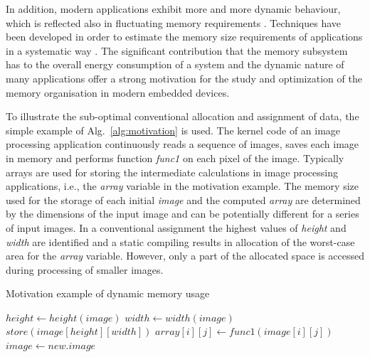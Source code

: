 \documentclass[a4paper,conference]{IEEEtran}
\begin{document}
In addition, modern applications exhibit more and more dynamic behaviour, which is reflected also in fluctuating memory requirements \cite{tcm}. Techniques have been developed in order to estimate the memory size requirements of applications in a systematic way \cite{Ang13}. The significant contribution that the memory subsystem has to the overall energy consumption of a system and the dynamic nature of many applications offer a strong motivation for the study and optimization of the memory organisation in modern embedded devices.

To illustrate the sub-optimal conventional allocation and assignment of data, the simple example of Alg.~\ref{alg:motivation} is used. The kernel code of an image processing application continuously reads a sequence of images, saves each image in memory and performs function \textit{func1} on each pixel of the image. Typically arrays are used for storing the intermediate calculations in image processing applications, i.e., the \textit{array} variable in the motivation example. The memory size used for the storage of each initial \textit{image} and the computed \textit{array} are determined by the dimensions of the input image and can be potentially different for a series of input images. In a conventional assignment the highest values of \textit{height} and \textit{width} are identified and a static compiling results in allocation of the worst-case area for the \textit{array} variable. However, only a part of the allocated space is accessed during processing of smaller images. 

\begin{algorithm}[!t]
\caption{Motivation example of dynamic memory usage}
 \label{alg:motivation}
 \begin{algorithmic}[1]
		\STATE $height \gets height(image)$
		\STATE $width \gets width(image)$
		\STATE $store(image[height][width])$
					\STATE $array[i][j] \gets func1(image[i][j])$
				\ENDFOR
			\ENDFOR
		\STATE $image \gets new.image$	
	\ENDWHILE
 \end{algorithmic}
\end{algorithm}
\end{document}
